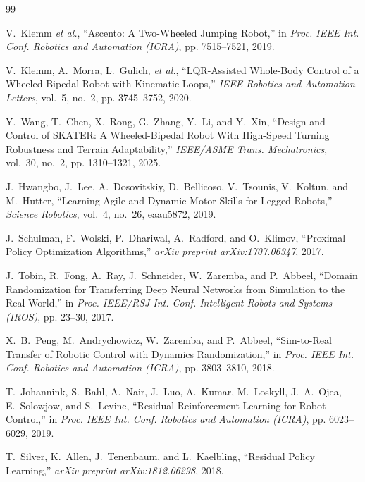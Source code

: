 \documentclass[conference]{IEEEtran}
\begin{document}
\begin{thebibliography}{99}
\setlength{\itemsep}{0pt}
\setlength{\parsep}{0pt}
\setlength{\topsep}{0pt}

V.~Klemm \emph{et al.},
``Ascento: A Two-Wheeled Jumping Robot,''
in \emph{Proc. IEEE Int. Conf. Robotics and Automation (ICRA)}, pp. 7515--7521, 2019.

V.~Klemm, A.~Morra, L.~Gulich, \emph{et al.},
``LQR-Assisted Whole-Body Control of a Wheeled Bipedal Robot with Kinematic Loops,''
\emph{IEEE Robotics and Automation Letters}, vol.~5, no.~2, pp. 3745--3752, 2020.

Y.~Wang, T.~Chen, X.~Rong, G.~Zhang, Y.~Li, and Y.~Xin,
``Design and Control of SKATER: A Wheeled-Bipedal Robot With High-Speed Turning Robustness and Terrain Adaptability,''
\emph{IEEE/ASME Trans. Mechatronics}, vol.~30, no.~2, pp. 1310--1321, 2025.

J.~Hwangbo, J.~Lee, A.~Dosovitskiy, D.~Bellicoso, V.~Tsounis, V.~Koltun, and M.~Hutter,
``Learning Agile and Dynamic Motor Skills for Legged Robots,''
\emph{Science Robotics}, vol.~4, no.~26, eaau5872, 2019.

J.~Schulman, F.~Wolski, P.~Dhariwal, A.~Radford, and O.~Klimov,
``Proximal Policy Optimization Algorithms,''
\emph{arXiv preprint arXiv:1707.06347}, 2017.

J.~Tobin, R.~Fong, A.~Ray, J.~Schneider, W.~Zaremba, and P.~Abbeel,
``Domain Randomization for Transferring Deep Neural Networks from Simulation to the Real World,''
in \emph{Proc. IEEE/RSJ Int. Conf. Intelligent Robots and Systems (IROS)}, pp. 23--30, 2017.

X.~B.~Peng, M.~Andrychowicz, W.~Zaremba, and P.~Abbeel,
``Sim-to-Real Transfer of Robotic Control with Dynamics Randomization,''
in \emph{Proc. IEEE Int. Conf. Robotics and Automation (ICRA)}, pp. 3803--3810, 2018.

T.~Johannink, S.~Bahl, A.~Nair, J.~Luo, A.~Kumar, M.~Loskyll, J.~A.~Ojea, E.~Solowjow, and S.~Levine,
``Residual Reinforcement Learning for Robot Control,''
in \emph{Proc. IEEE Int. Conf. Robotics and Automation (ICRA)}, pp. 6023--6029, 2019.

T.~Silver, K.~Allen, J.~Tenenbaum, and L.~Kaelbling,
``Residual Policy Learning,''
\emph{arXiv preprint arXiv:1812.06298}, 2018.


\end{thebibliography}
\end{document}

